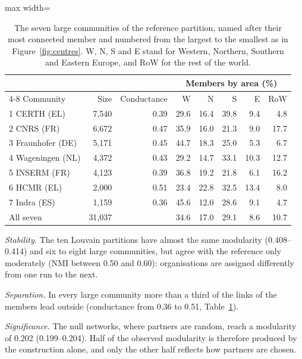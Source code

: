 \documentclass[sigchi]{acmart}
\begin{document}
\begin{table}[t]
\caption{The seven large communities of the reference partition, named after their most connected member and numbered from the largest to the smallest as in Figure~\ref{fig:centres}. W, N, S and E stand for Western, Northern, Southern and Eastern Europe, and RoW for the rest of the world.}
\label{tab:seven}
\small
\renewcommand{\arraystretch}{1.15}
\setlength{\tabcolsep}{4pt}
\begin{adjustbox}{max width=\columnwidth}
\begin{tabular}{@{}lrrrrrrr@{}}
\toprule
 & & & \multicolumn{5}{c}{Members by area (\%)} \\
\cmidrule(l){4-8}
Community & Size & Conductance & W & N & S & E & RoW \\
\midrule
1 CERTH (EL) & 7,540 & 0.39 & 29.6 & 16.4 & 39.8 & 9.4 & 4.8 \\
2 CNRS (FR) & 6,672 & 0.47 & 35.9 & 16.0 & 21.3 & 9.0 & 17.7 \\
3 Fraunhofer (DE) & 5,171 & 0.45 & 44.7 & 18.3 & 25.0 & 5.3 & 6.7 \\
4 Wageningen (NL) & 4,372 & 0.43 & 29.2 & 14.7 & 33.1 & 10.3 & 12.7 \\
5 INSERM (FR) & 4,123 & 0.39 & 36.8 & 19.2 & 21.8 & 6.1 & 16.2 \\
6 HCMR (EL) & 2,000 & 0.51 & 23.4 & 22.8 & 32.5 & 13.4 & 8.0 \\
7 Indra (ES) & 1,159 & 0.36 & 45.6 & 12.0 & 28.6 & 9.1 & 4.7 \\
\midrule
All seven & 31,037 & & 34.6 & 17.0 & 29.1 & 8.6 & 10.7 \\
\bottomrule
\end{tabular}
\end{adjustbox}
\end{table}

\emph{Stability.} The ten Louvain partitions have almost the same modularity (0.408--0.414) and six to eight large communities, but agree with the reference only moderately (NMI between 0.50 and 0.60): organisations are assigned differently from one run to the next.

\emph{Separation.} In every large community more than a third of the links of the members lead outside (conductance from 0.36 to 0.51, Table~\ref{tab:seven}).

\emph{Significance.} The null networks, where partners are random, reach a modularity of 0.202 (0.199--0.204). Half of the observed modularity is therefore produced by the construction alone, and only the other half reflects how partners are chosen.
\end{document}

